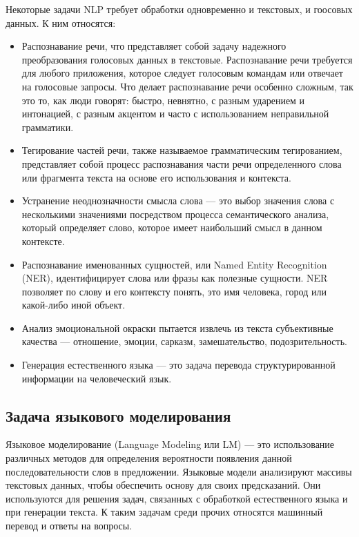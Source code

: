 Некоторые задачи NLP требует обработки одновременно и текстовых, и гоосовых данных. К ним относятся: 

\begin{itemize}
	\item Распознавание речи, что представляет собой задачу надежного преобразования голосовых данных в текстовые. Распознавание речи требуется для любого приложения, которое следует голосовым командам или отвечает на голосовые запросы. Что делает распознавание речи особенно сложным, так это то, как люди говорят: быстро, невнятно, с разным ударением и интонацией, с разным акцентом и часто с использованием неправильной грамматики.
	
	\item Тегирование частей речи, также называемое грамматическим тегированием, представляет собой процесс распознавания части речи определенного слова или фрагмента текста на основе его использования и контекста.
	
	\item Устранение неоднозначности смысла слова --- это выбор значения слова с несколькими значениями посредством процесса семантического анализа, который определяет слово, которое имеет наибольший смысл в данном контексте.
	
	\item Распознавание именованных сущностей, или Named Entity Recognition (NER), идентифицирует слова или фразы как полезные сущности. NER позволяет по слову и его контексту понять, это имя человека, город или какой-либо иной объект.
	
	\item Анализ эмоциональной окраски пытается извлечь из текста субъективные качества — отношение, эмоции, сарказм, замешательство, подозрительность.
	
	\item Генерация естественного языка ---  это задача перевода структурированной информации на человеческий язык.~\cite{ibm_nlp}
\end{itemize}

\subsection{Задача языкового моделирования}
\label{sub:domain:language_modeling}

Языковое моделирование (Language Modeling или LM) — это использование различных методов для определения вероятности появления данной последовательности слов в предложении. Языковые модели анализируют массивы текстовых данных, чтобы обеспечить основу для своих предсказаний. Они используются для решения задач, связанных с обработкой естественного языка и при генерации текста. К таким задачам среди прочих относятся машинный перевод и ответы на вопросы.

